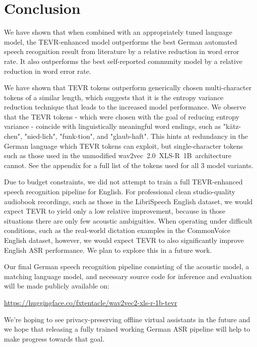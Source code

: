 \documentclass{article} \usepackage{iclr2022_conference,times}
\begin{document}
\section{Conclusion}

We have shown that when combined with an appropriately tuned language model, the TEVR-enhanced model outperforms the best German automated speech recognition result from literature by a relative  reduction in word error rate. 
It also outperforms the best self-reported community model by a relative  reduction in word error rate.

We have shown that TEVR tokens outperform generically chosen multi-character tokens of a similar length, which suggests that it is the entropy variance reduction technique that leads to the increased model performance. 
We observe that the TEVR tokens - which were chosen with the goal of reducing entropy variance -  coincide with linguistically meaningful word endings, such as "kätz-chen", "nied-lich", "funk-tion", and "glaub-haft". This hints at redundancy in the German language which TEVR tokens can exploit, but single-character tokens such as those used in the unmodified wav2vec~2.0~XLS-R~1B~architecture cannot. See the appendix for a full list of the tokens used for all 3 model variants.

Due to budget constraints, we did not attempt to train a full TEVR-enhanced speech recognition pipeline for English. For professional clean studio-quality audiobook recordings, such as those in the LibriSpeech English dataset, we would expect TEVR to yield only a low relative improvement, because in those situations there are only few acoustic ambiguities. When operating under difficult conditions, such as the real-world dictation examples in the CommonVoice English dataset, however, we would expect TEVR to also significantly improve English ASR performance. We plan to explore this in a future work.

Our final German speech recognition pipeline consisting of the acoustic model, a matching language model, and necessary source code for inference and evaluation will be made publicly available on:

\url{https://huggingface.co/fxtentacle/wav2vec2-xls-r-1b-tevr}

We're hoping to see privacy-preserving offline virtual assistants in the future and we hope that releasing a fully trained working German ASR pipeline will help to make progress towards that goal.




\end{document}

